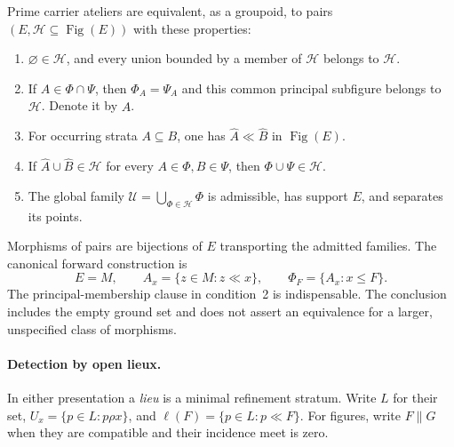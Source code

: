 \begin{theorem}
\label{thm:set-atlas}
Prime carrier ateliers are equivalent, as a groupoid, to pairs
$(E,\mathscr H\subseteq\operatorname{Fig}(E))$ with these properties:
\begin{enumerate}
\item $\varnothing\in\mathscr H$, and every union bounded by a
member of $\mathscr H$ belongs to $\mathscr H$.
\item If $A\in\Phi\cap\Psi$, then
$\Phi_A=\Psi_A$ and this common principal subfigure belongs
to $\mathscr H$. Denote it by $\widehat A$.
\item For occurring strata $A\subseteq B$, one has
$\widehat A\ll\widehat B$ in $\operatorname{Fig}(E)$.
\item If $\widehat A\cup\widehat B\in\mathscr H$ for every
$A\in\Phi,B\in\Psi$, then $\Phi\cup\Psi\in\mathscr H$.
\item The global family
$\mathscr U=\bigcup_{\Phi\in\mathscr H}\Phi$ is admissible,
has support $E$, and separates its points.
\end{enumerate}
Morphisms of pairs are bijections of $E$ transporting the admitted
families. The canonical forward construction is
\[
 E=M,\qquad A_x=\{z\in M:z\ll x\},\qquad
 \Phi_F=\{A_x:x\leq F\}.
\]
The principal-membership clause in condition~2 is indispensable.
The conclusion includes the empty ground set and does not assert
an equivalence for a larger, unspecified class of morphisms.
\end{theorem}

\paragraph{Detection by open lieux.}
In either presentation a \emph{lieu} is a minimal refinement
stratum. Write $L$ for their set,
$U_x=\{p\in L:p\rho x\}$, and
$\ell(F)=\{p\in L:p\ll F\}$.
For figures, write $F\parallel G$ when they are compatible
and their incidence meet is zero.

